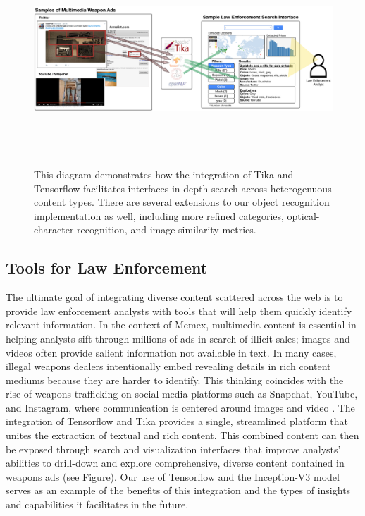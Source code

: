 \begin{figure}
	\includegraphics[width=\textwidth,height=8cm]{interface-diagram}
	\caption{This diagram demonstrates how the integration of Tika and Tensorflow facilitates interfaces in-depth search across heterogenuous content types. There are several extensions to our object recognition implementation as well, including more refined categories, optical-character recognition, and image similarity metrics.}
	\label{fig:interface-diagram}
\end{figure}

\subsection{Tools for Law Enforcement} \label{sec:memex-tools}
The ultimate goal of integrating diverse content scattered across the web is to provide law enforcement analysts with tools that will help them quickly identify relevant information. In the context of Memex, multimedia content is essential in helping analysts sift through millions of ads in search of illicit sales; images and videos often provide salient information not available in text. In many cases, illegal weapons dealers intentionally embed revealing details in rich content mediums because they are harder to identify. This thinking coincides with the rise of weapons trafficking on social media platforms such as Snapchat, YouTube, and Instagram, where communication is centered around images and video \cite{socialmedia}. The integration of Tensorflow and Tika provides a single, streamlined platform that unites the extraction of textual and rich content. This combined content can then be exposed through search and visualization interfaces that improve analysts' abilities to drill-down and explore comprehensive, diverse content contained in weapons ads (see Figure). Our use of Tensorflow and the Inception-V3 model serves as an example of the benefits of this integration and the types of insights and capabilities it facilitates in the future. 